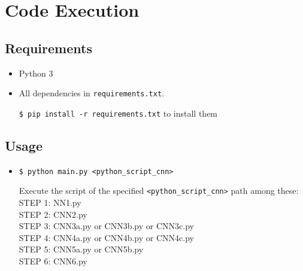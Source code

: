 \documentclass[a4paper, 11pt]{article}
\begin{document}
	\FloatBarrier
	
	
		
	\section{Code Execution}
	\subsection{Requirements}
	\begin{itemize}
		\item Python 3
		\item All dependencies in \texttt{requirements.txt}.
		
		\texttt{\$ pip install -r requirements.txt} to install them
	\end{itemize}
	\subsection{Usage}
	\begin{itemize}
		\item \texttt{\$ python main.py <python\_script\_cnn>}
		
		Execute the script of the specified \texttt{<python\_script\_cnn>} path among these: \\
		STEP 1: NN1.py\\
		STEP 2: CNN2.py\\
		STEP 3: CNN3a.py or CNN3b.py or CNN3c.py\\
		STEP 4: CNN4a.py or CNN4b.py or CNN4c.py\\
		STEP 5: CNN5a.py or CNN5b.py\\
		STEP 6: CNN6.py\\
		
	\end{itemize}
	
\end{document}
